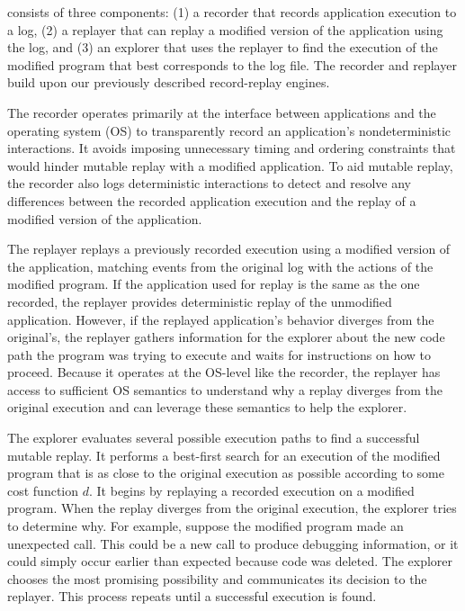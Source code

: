{\dora} consists of three components: (1) a recorder that records
application execution to a log, (2) a replayer that can replay a
modified version of the application using the log, and (3) an explorer
that uses the replayer to find the execution of the modified program
that best corresponds to the log file. The recorder and replayer build
upon our previously described record-replay engines.

The recorder operates primarily at the interface between applications and the
operating system (OS) to transparently record an application's nondeterministic
interactions. It avoids imposing unnecessary timing and ordering constraints
that would hinder mutable replay with a modified application.  To aid mutable
replay, the recorder also logs deterministic interactions to detect and
resolve any differences between the recorded application execution and the
replay of a modified version of the application.

The replayer replays a previously recorded execution using a modified version
of the application, matching events from the original
log with the actions of the modified program.
If the application used for replay is the same as the one recorded, the replayer
provides deterministic replay of the unmodified application.  However,
if the replayed application's behavior diverges from the original's,
the replayer gathers information for the explorer about the new code
path the program was trying to execute and waits for instructions on
how to proceed.  Because it operates at the OS-level like the
recorder, the replayer has access to sufficient OS semantics to
understand why a replay diverges from the original execution and can
leverage these semantics to help the explorer.

The explorer evaluates several possible execution paths to find a successful
mutable replay.  It performs a best-first search for an execution of
the modified program that is as close to the original execution as
possible according to some cost function $d$. It begins by replaying a
recorded execution on a modified program. When the replay diverges
from the original execution, the explorer tries to determine
why. For example, suppose the modified program made an unexpected
 call. This could be a new call to produce debugging
information, or it could simply occur earlier than expected because
code was deleted. The explorer chooses the most promising possibility
and communicates its decision to the replayer. This process repeats
until a successful execution is found.

